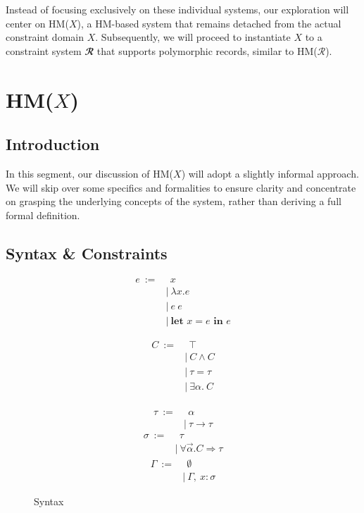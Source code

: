 \documentclass[runningheads]{llncs}
\newcommand{\hmx}{HM($X$)}
\newcommand{\hmr}{HM($\mathcal{R}$)}
\newcommand{\kwlet}{\textbf{let }}
\newcommand{\kwin}{\textbf{ in }}
\begin{document}
Instead of focusing exclusively on these individual systems, our
exploration
will center on \hmx{}, a HM-based system that remains detached from
the actual constraint domain $X$.
Subsequently, we will proceed to instantiate $X$ to a constraint system
$𝓡$
that supports polymorphic records, similar to \hmr{}.

\section{\hmx{}}

\subsection{Introduction}
In this segment, our discussion of \hmx{} will adopt a slightly informal
approach.
We will skip over some specifics and formalities to ensure clarity and
concentrate on
grasping the underlying concepts of the system, rather than deriving a
full
formal definition.

\subsection{Syntax \& Constraints}
\begin{figure}[t]
  \centering
  \begin{subfigure}[t]{0.3\textwidth}
    \begin{align*}
      e \ := & \ \ x                    \\
             & | \ λx. e                \\
             & | \ e \ e                \\
             & | \ \kwlet x = e \kwin e
    \end{align*}
  \end{subfigure}
  \begin{subfigure}[t]{0.3\textwidth}
    \begin{align*}
      C \ := & \ \ ⊤       \\
             & | \ C ∧ C   \\
             & | \ τ = τ   \\
             & | \ ∃α. \ C \\
    \end{align*}
  \end{subfigure}
  \begin{subfigure}[t]{0.3\textwidth}
    \begin{align*}
      τ \ := & \ \ α     \\
             & | \ τ → τ
    \end{align*}
    \begin{align*}
      σ \ := & \ \ τ             \\
             & | \ ∀\Vec α.C ⇒ τ
    \end{align*}
    \begin{align*}
      Γ \ := & \ \ ∅           \\
             & | \ Γ , \ x : σ
    \end{align*}
  \end{subfigure}
  \caption{Syntax}
\end{figure}
\end{document}
